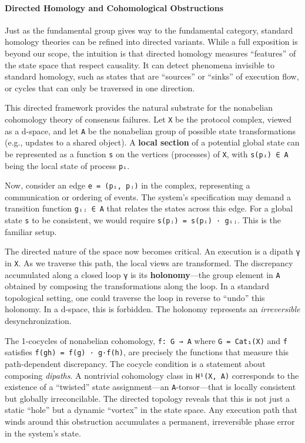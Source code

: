 \documentclass[
]{article}
\begin{document}
\paragraph{Directed Homology and Cohomological
Obstructions}\label{directed-homology-and-cohomological-obstructions}

Just as the fundamental group gives way to the fundamental category,
standard homology theories can be refined into directed variants. While
a full exposition is beyond our scope, the intuition is that directed
homology measures ``features'' of the state space that respect
causality. It can detect phenomena invisible to standard homology, such
as states that are ``sources'' or ``sinks'' of execution flow, or cycles
that can only be traversed in one direction.

This directed framework provides the natural substrate for the
nonabelian cohomology theory of consensus failures. Let \texttt{X} be
the protocol complex, viewed as a d-space, and let \texttt{A} be the
nonabelian group of possible state transformations (e.g., updates to a
shared object). A \textbf{local section} of a potential global state can
be represented as a function \texttt{s} on the vertices (processes) of
\texttt{X}, with \texttt{s(pᵢ)\ ∈\ A} being the local state of process
\texttt{pᵢ}.

Now, consider an edge \texttt{e\ =\ (pᵢ,\ pⱼ)} in the complex,
representing a communication or ordering of events. The system's
specification may demand a transition function \texttt{gᵢⱼ\ ∈\ A} that
relates the states across this edge. For a global state \texttt{s} to be
consistent, we would require \texttt{s(pⱼ)\ =\ s(pᵢ)\ ·\ gᵢⱼ}. This is
the familiar setup.

The directed nature of the space now becomes critical. An execution is a
dipath \texttt{γ} in \texttt{X}. As we traverse this path, the local
views are transformed. The discrepancy accumulated along a closed loop
\texttt{γ} is its \textbf{holonomy}---the group element in \texttt{A}
obtained by composing the transformations along the loop. In a standard
topological setting, one could traverse the loop in reverse to ``undo''
this holonomy. In a d-space, this is forbidden. The holonomy represents
an \emph{irreversible} desynchronization.

The 1-cocycles of nonabelian cohomology, \texttt{f:\ G\ →\ A} where
\texttt{G\ =\ Cat₁(X)} and \texttt{f} satisfies
\texttt{f(gh)\ =\ f(g)\ ·\ g·f(h)}, are precisely the functions that
measure this path-dependent discrepancy. The cocycle condition is a
statement about composing \emph{dipaths}. A nontrivial cohomology class
in \texttt{H¹(X,\ A)} corresponds to the existence of a ``twisted''
state assignment---an \texttt{A}-torsor---that is locally consistent but
globally irreconcilable. The directed topology reveals that this is not
just a static ``hole'' but a dynamic ``vortex'' in the state space. Any
execution path that winds around this obstruction accumulates a
permanent, irreversible phase error in the system's state.
\end{document}
